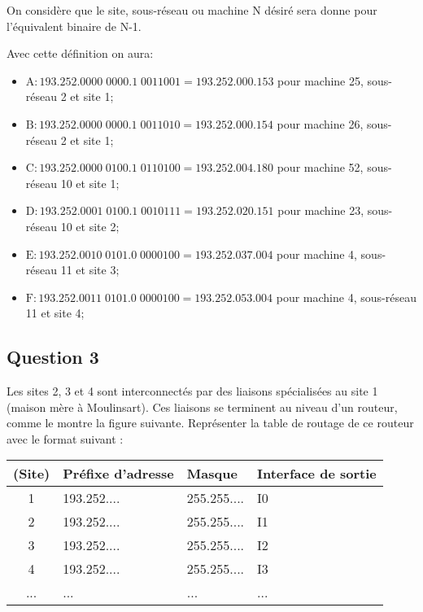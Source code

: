 \documentclass{article}
\begin{document}
\begin{resolution}
\begin{definition}
    \end{definition}
    \begin{remark}
        On considère que le site, sous-réseau ou machine N désiré sera donne pour l'équivalent binaire de N-1.
    \end{remark}
    Avec cette définition on aura:
    \begin{itemize}[noitemsep]
        \item $\boxed{\text{A} : 193.252.0000\;0000.1\;0011001 = 193.252.000.153}$ pour machine 25, sous-réseau 2 et site 1;
        \item $\boxed{\text{B} : 193.252.0000\;0000.1\;0011010 = 193.252.000.154}$ pour machine 26, sous-réseau 2 et site 1;
        \item $\boxed{\text{C} : 193.252.0000\;0100.1\;0110100 = 193.252.004.180}$ pour machine 52, sous-réseau 10 et site 1;
        \item $\boxed{\text{D} : 193.252.0001\;0100.1\;0010111 = 193.252.020.151}$ pour machine 23, sous-réseau 10 et site 2;
        \item $\boxed{\text{E} : 193.252.0010\;0101.0\;0000100 = 193.252.037.004}$ pour machine 4, sous-réseau 11 et site 3;
        \item $\boxed{\text{F} : 193.252.0011\;0101.0\;0000100 = 193.252.053.004}$ pour machine 4, sous-réseau 11 et site 4;
    \end{itemize}
\end{resolution}

\subsection*{Question 3}
\begin{exercise}
    Les sites 2, 3 et 4 sont interconnectés par des liaisons spécialisées au site 1 (maison mère à Moulinsart). Ces liaisons se terminent au niveau d'un routeur, comme le montre la figure suivante. Représenter la table de routage de ce routeur avec le format suivant :
    \begin{table}[H]
        \centering\begin{tabular}{clll}
            (Site) & Préfixe d'adresse & Masque & Interface de sortie\\
            \hline
            1 & 193.252.... & 255.255.... & I0\\
            2 & 193.252.... & 255.255.... & I1\\
            3 & 193.252.... & 255.255.... & I2\\
            4 & 193.252.... & 255.255.... & I3\\
            ... & ... & ... & ...\\
            \hline
        \end{tabular}
    \end{table}
\end{exercise}
\begin{resolution}

\end{resolution}
\end{document}
